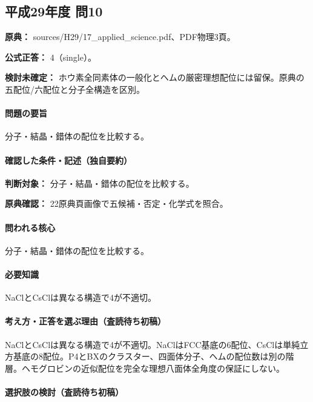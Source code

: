 \subsection{平成29年度 問10}
\label{q:h29-reg-applied-10}

\noindent\textbf{原典：} sources/H29/17\_applied\_science.pdf、PDF物理3頁。

\textbf{公式正答：} 4（single）。

\par\textbf{検討未確定：} ホウ素全同素体の一般化とヘムの厳密理想配位には留保。原典の五配位/六配位と分子全構造を区別。

\paragraph{問題の要旨} 分子・結晶・錯体の配位を比較する。

\paragraph{確認した条件・記述（独自要約）}\mbox{}\par

\noindent\textbf{判断対象：} 分子・結晶・錯体の配位を比較する。\par

\noindent\textbf{原典確認：} 22原典頁画像で五候補・否定・化学式を照合。\par

\paragraph{問われる核心} 分子・結晶・錯体の配位を比較する。

\paragraph{必要知識} NaClとCsClは異なる構造で4が不適切。

\paragraph{考え方・正答を選ぶ理由（査読待ち初稿）} NaClとCsClは異なる構造で4が不適切。NaClはFCC基底の6配位、CsClは単純立方基底の8配位。P4とBXのクラスター、四面体分子、ヘムの配位数は別の階層。ヘモグロビンの近似配位を完全な理想八面体全角度の保証にしない。

\paragraph{選択肢の検討（査読待ち初稿）}\mbox{}\par

